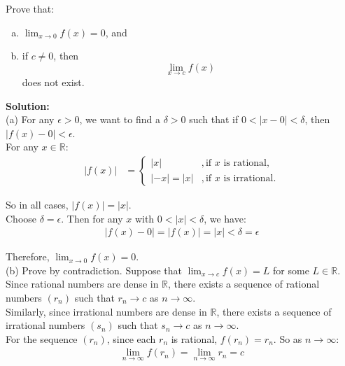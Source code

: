 \documentclass{article}
\begin{document}
Prove that:
\begin{enumerate}[(a)]
    \item $\lim_{x \to 0} f(x) = 0$, and
    \item if $c \neq 0$, then
    $$\lim_{x \to c} f(x)$$
    does not exist. \\
\end{enumerate}

\textbf{Solution: } \\

(a) For any $\epsilon > 0$, we want to find a $\delta > 0$ such that if $0 < |x - 0| < \delta$, then $|f(x) - 0| < \epsilon$. \\

For any $x \in \mathbb{R}$:
\begin{align*}
|f(x)| &= \begin{cases}
|x| & , \text{if } x \text{ is rational}, \\
|-x| = |x| & , \text{if } x \text{ is irrational}.
\end{cases}
\end{align*}

So in all cases, $|f(x)| = |x|$. \\

Choose $\delta = \epsilon$. Then for any $x$ with $0 < |x| < \delta$, we have:
\begin{align*}
|f(x) - 0| = |f(x)| = |x| < \delta = \epsilon
\end{align*}

Therefore, $\lim_{x \to 0} f(x) = 0$. \\

(b) Prove by contradiction. Suppose that $\lim_{x \to c} f(x) = L$ for some $L \in \mathbb{R}$. \\

Since rational numbers are dense in $\mathbb{R}$, there exists a sequence of rational numbers $(r_n)$ such that $r_n \to c$ as $n \to \infty$. \\

Similarly, since irrational numbers are dense in $\mathbb{R}$, there exists a sequence of irrational numbers $(s_n)$ such that $s_n \to c$ as $n \to \infty$. \\

For the sequence $(r_n)$, since each $r_n$ is rational, $f(r_n) = r_n$. So as $n \to \infty$:
\begin{align*}
\lim_{n \to \infty} f(r_n) = \lim_{n \to \infty} r_n = c
\end{align*}
\end{document}
